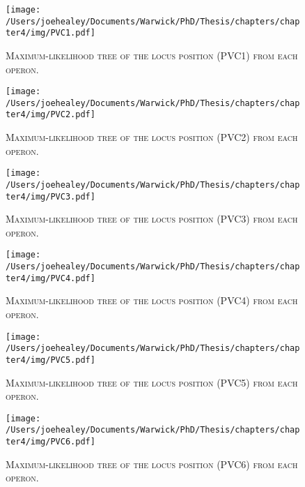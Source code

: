 \begin{figure}[h!]
	\centering
	\texttt{[image: /Users/joehealey/Documents/Warwick/PhD/Thesis/chapters/chapter4/img/PVC1.pdf]}
	\captionsetup{singlelinecheck=off, justification=justified, font=footnotesize, aboveskip=19pt}
	\caption[Gene tree for the first PVC locus]{\textsc{\normalsize Maximum-likelihood tree of the locus position (PVC1) from each operon.}}
	\label{pvc1tree}
\end{figure}
\hfill
\begin{figure}[h!]
	\centering
	\texttt{[image: /Users/joehealey/Documents/Warwick/PhD/Thesis/chapters/chapter4/img/PVC2.pdf]}
	\captionsetup{singlelinecheck=off, justification=justified, font=footnotesize, aboveskip=19pt}
	\caption[Gene tree for the second PVC locus]{\textsc{\normalsize Maximum-likelihood tree of the locus position (PVC2) from each operon.}}
	\label{pvc2tree}
\end{figure}

\newpage

\begin{figure}[h!]
	\centering
	\texttt{[image: /Users/joehealey/Documents/Warwick/PhD/Thesis/chapters/chapter4/img/PVC3.pdf]}
	\captionsetup{singlelinecheck=off, justification=justified, font=footnotesize, aboveskip=19pt}
	\caption[Gene tree for the third PVC locus]{\textsc{\normalsize Maximum-likelihood tree of the locus position (PVC3) from each operon.}}
	\label{pvc3tree}
\end{figure}
\hfill
\begin{figure}[h!]
	\centering
	\texttt{[image: /Users/joehealey/Documents/Warwick/PhD/Thesis/chapters/chapter4/img/PVC4.pdf]}
	\captionsetup{singlelinecheck=off, justification=justified, font=footnotesize, aboveskip=19pt}
	\caption[Gene tree for the fourth PVC locus]{\textsc{\normalsize Maximum-likelihood tree of the locus position (PVC4) from each operon.}}
	\label{pvc4tree}
\end{figure}

\newpage

\begin{figure}[h!]
	\centering
	\texttt{[image: /Users/joehealey/Documents/Warwick/PhD/Thesis/chapters/chapter4/img/PVC5.pdf]}
	\captionsetup{singlelinecheck=off, justification=justified, font=footnotesize, aboveskip=19pt}
	\caption[Gene tree for the fifth PVC locus]{\textsc{\normalsize Maximum-likelihood tree of the locus position (PVC5) from each operon.}}
	\label{pvc5tree}
\end{figure}
\hfill
\begin{figure}[h!]
	\centering
	\texttt{[image: /Users/joehealey/Documents/Warwick/PhD/Thesis/chapters/chapter4/img/PVC6.pdf]}
	\captionsetup{singlelinecheck=off, justification=justified, font=footnotesize, aboveskip=19pt}
	\caption[Gene tree for the sixth PVC locus]{\textsc{\normalsize Maximum-likelihood tree of the locus position (PVC6) from each operon.}}
	\label{pvc6tree}
\end{figure}


